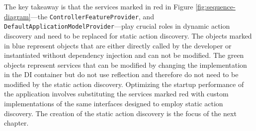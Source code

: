 The key takeaway is that the services marked in red in Figure \ref{fig:sequence-diagram}—the \verb|ControllerFeatureProvider|, and \verb|DefaultApplicationModelProvider|—play crucial roles in dynamic action discovery and need to be replaced for static action discovery. The objects marked in blue represent objects that are either directly called by the developer or instantiated without dependency injection and can not be modified. The green objects represent services that can be modified by changing the implementation in the DI container but do not use reflection and therefore do not need to be modified by the static action discovery. Optimizing the startup performance of the application involves substituting the services marked red with custom implementations of the same interfaces designed to employ static action discovery. The creation of the static action discovery is the focus of the next chapter.